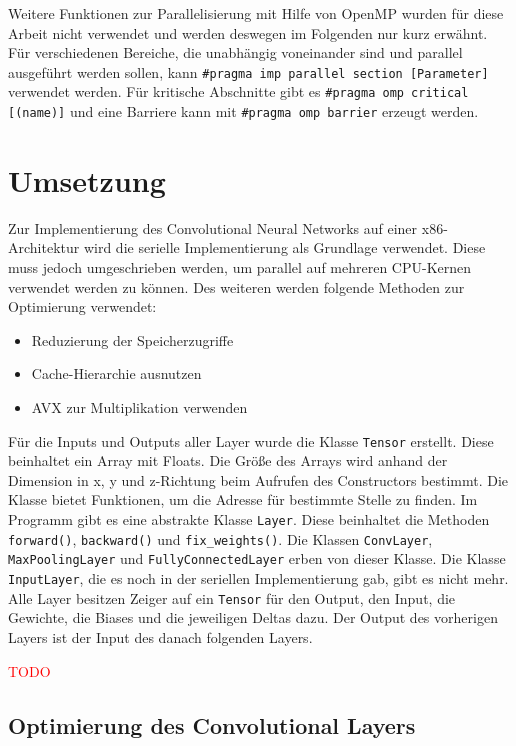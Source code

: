 \documentclass[../main.tex]{subfiles}
\begin{document}
Weitere Funktionen zur Parallelisierung mit Hilfe von OpenMP wurden für diese Arbeit nicht verwendet und werden deswegen im Folgenden nur kurz erwähnt.
Für verschiedenen Bereiche, die unabhängig voneinander sind und parallel ausgeführt werden sollen, kann \texttt{\#pragma imp parallel section [Parameter]} verwendet werden.
Für kritische Abschnitte gibt es \texttt{\#pragma omp critical [(name)]} und eine Barriere kann mit \texttt{\#pragma omp barrier} erzeugt werden.

\section{Umsetzung}

Zur Implementierung des Convolutional Neural Networks auf einer x86-Architektur wird die serielle Implementierung als Grundlage verwendet. Diese muss jedoch umgeschrieben werden, um parallel auf mehreren CPU-Kernen verwendet werden zu können. Des weiteren werden folgende Methoden zur Optimierung verwendet:
\begin{itemize}
	\item Reduzierung der Speicherzugriffe
	\item Cache-Hierarchie ausnutzen
	\item AVX zur Multiplikation verwenden
\end{itemize}

Für die Inputs und Outputs aller Layer wurde die Klasse \texttt{Tensor} erstellt. Diese beinhaltet ein Array mit Floats. Die Größe des Arrays wird anhand der Dimension in x, y und z-Richtung beim Aufrufen des Constructors bestimmt. Die Klasse bietet Funktionen, um die Adresse für bestimmte Stelle zu finden.
Im Programm gibt es eine abstrakte Klasse \texttt{Layer}. Diese beinhaltet die Methoden \texttt{forward()}, \texttt{backward()} und \texttt{fix\_weights()}. Die Klassen \texttt{ConvLayer}, \texttt{MaxPoolingLayer} und \texttt{FullyConnectedLayer} erben von dieser Klasse. Die Klasse \texttt{InputLayer}, die es noch in der seriellen Implementierung gab, gibt es nicht mehr. Alle Layer besitzen Zeiger auf ein \texttt{Tensor} für den Output, den Input, die Gewichte, die Biases und die jeweiligen Deltas dazu. Der Output des vorherigen Layers ist der Input des danach folgenden Layers.

\textcolor{red}{TODO}

\subsection{Optimierung des Convolutional Layers}
\end{document}
